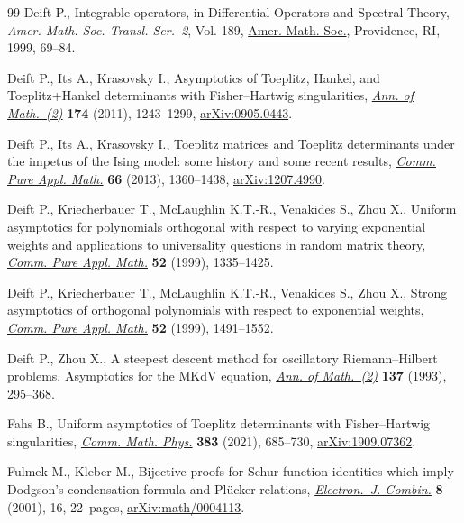 \begin{thebibliography}{99}
Deift P., Integrable operators, in Differential {O}perators and {S}pectral
 {T}heory, \textit{Amer. Math. Soc. Transl. Ser.~2}, Vol. 189, \href{https://doi.org/10.1090/trans2/189/06}{Amer. Math.
 Soc.}, Providence, RI, 1999, 69--84.

Deift P., Its A., Krasovsky I., Asymptotics of {T}oeplitz, {H}ankel, and
 {T}oeplitz+{H}ankel determinants with {F}isher--{H}artwig singularities,
 \href{https://doi.org/10.4007/annals.2011.174.2.12}{\textit{Ann. of Math.~(2)}} \textbf{174} (2011), 1243--1299,
 \href{https://arxiv.org/abs/0905.0443}{arXiv:0905.0443}.

Deift P., Its A., Krasovsky I., Toeplitz matrices and {T}oeplitz determinants
 under the impetus of the {I}sing model: some history and some recent results,
 \href{https://doi.org/10.1002/cpa.21467}{\textit{Comm. Pure Appl. Math.}} \textbf{66} (2013), 1360--1438,
 \href{https://arxiv.org/abs/1207.4990}{arXiv:1207.4990}.


Deift P., Kriecherbauer T., McLaughlin K.T.-R., Venakides S., Zhou X., Uniform
 asymptotics for polynomials orthogonal with respect to varying exponential
 weights and applications to universality questions in random matrix theory,
 \href{https://doi.org/10.1002/(SICI)1097-0312(199911)52:11<1335::AID-CPA1>3.0.CO;2-1}{\textit{Comm. Pure Appl. Math.}} \textbf{52} (1999), 1335--1425.

Deift P., Kriecherbauer T., McLaughlin K.T.-R., Venakides S., Zhou X., Strong
 asymptotics of orthogonal polynomials with respect to exponential weights,
 \href{https://doi.org/10.1002/(SICI)1097-0312(199912)52:12<1491::AID-CPA2>3.3.CO;2-R}{\textit{Comm. Pure Appl. Math.}} \textbf{52} (1999), 1491--1552.
 
Deift P., Zhou X., A steepest descent method for oscillatory
 {R}iemann--{H}ilbert problems. {A}symptotics for the {MK}d{V} equation,
 \href{https://doi.org/10.2307/2946540}{\textit{Ann. of Math.~(2)}} \textbf{137} (1993), 295--368.

Fahs B., Uniform asymptotics of {T}oeplitz determinants with
 {F}isher--{H}artwig singularities, \href{https://doi.org/10.1007/s00220-021-03943-0}{\textit{Comm. Math. Phys.}} \textbf{383}
 (2021), 685--730, \href{https://arxiv.org/abs/1909.07362}{arXiv:1909.07362}.

Fulmek M., Kleber M., Bijective proofs for {S}chur function identities which
 imply {D}odgson's condensation formula and {P}l\"ucker relations,
 \href{https://doi.org/10.37236/1560}{\textit{Electron.~J. Combin.}} \textbf{8} (2001), 16, 22~pages,
 \href{https://arxiv.org/abs/math/0004113}{arXiv:math/0004113}.


\end{thebibliography}
